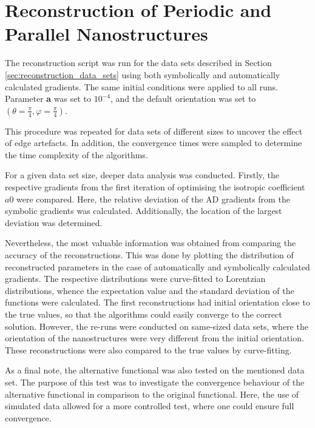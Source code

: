 \section{Reconstruction of Periodic and Parallel Nanostructures}


The reconstruction script was run for the data sets described in Section \ref{sec:reconstruction_data_sets} using both symbolically and automatically calculated gradients.
The same initial conditions were applied to all runs.
Parameter \textbf{a} was set to $10^{-4}$, and the default orientation was set to $\left( \theta = \frac{\pi}{4}, \varphi = \frac{\pi}{4} \right)$.

This procedure was repeated for data sets of different sizes to uncover the effect of edge artefacts.
In addition, the convergence times were sampled to determine the time complexity of the algorithms.

For a given data set size, deeper data analysis was conducted.
Firstly, the respective gradients from the first iteration of optimising the isotropic coefficient $a0$ were compared.
Here, the relative deviation of the AD gradients from the symbolic gradients was calculated.
Additionally, the location of the largest deviation was determined.

Nevertheless, the most valuable information was obtained from comparing the accuracy of the reconstructions.
This was done by plotting the distribution of reconstructed parameters in the case of automatically and symbolically calculated gradients.
The respective distributions were curve-fitted to Lorentzian distributions, whence the expectation value and the standard deviation of the functions were calculated.
The first reconstructions had initial orientation close to the true values, so that the algorithms could easily converge to the correct solution.
However, the re-runs were conducted on same-sized data sets, where the orientation of the nanostructures were very different from the initial orientation.
These reconstructions were also compared to the true values by curve-fitting.

As a final note, the alternative functional was also tested on the mentioned data set.
The purpose of this test was to investigate the convergence behaviour of the alternative functional in comparison to the original functional.
Here, the use of simulated data allowed for a more controlled test, where one could ensure full convergence.

